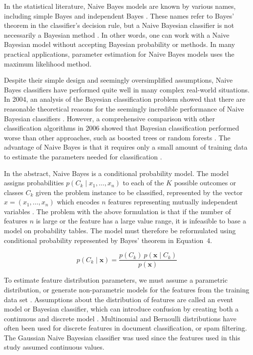 \documentclass[sn-mathphys-num]{sn-jnl}%
\begin{document}
In the statistical literature, Naive Bayes models are known by various names, including simple Bayes and independent Bayes \cite{Hand2001}. These names refer to Bayes' theorem in the classifier's decision rule, but a Naive Bayesian classifier is not necessarily a Bayesian method \cite{Russell1999, Hand2001}. In other words, one can work with a Naive Bayesian model without accepting Bayesian probability or methods. In many practical applications, parameter estimation for Naive Bayes models uses the maximum likelihood method.

Despite their simple design and seemingly oversimplified assumptions, Naive Bayes classifiers have performed quite well in many complex real-world situations. In 2004, an analysis of the Bayesian classification problem showed that there are reasonable theoretical reasons for the seemingly incredible performance of Naive Bayesian classifiers \cite{Zhang2004}. However, a comprehensive comparison with other classification algorithms in 2006 showed that Bayesian classification performed worse than other approaches, such as boosted trees or random forests \cite{Caruana2006}. The advantage of Naive Bayes is that it requires only a small amount of training data to estimate the parameters needed for classification \cite{stackexchange}.

In the abstract, Naive Bayes is a conditional probability model. The model assigns probabilities $p(C_{k}\mid x_{1},\ldots, x_{n})$ to each of the $K$ possible outcomes or classes $C_{k}$ given the problem instance to be classified, represented by the vector $x = (x_{1},\ldots, x_{n})$ which encodes $n$ features representing mutually independent variables \cite{Murty2011}. The problem with the above formulation is that if the number of features $n$ is large or the feature has a large value range, it is infeasible to base a model on probability tables. The model must therefore be reformulated using conditional probability represented by Bayes' theorem in Equation~4.

\begin{equation}
	p(C_{k}\mid \mathbf{x})={\frac{p(C_{k})\ p(\mathbf{x} \mid C_{k})}{p(\mathbf{x})}}
	\label{eqn:4}
\end{equation}

To estimate feature distribution parameters, we must assume a parametric distribution, or generate non-parametric models for the features from the training data set \cite{John2013}. Assumptions about the distribution of features are called an event model or Bayesian classifier, which can introduce confusion by creating both a continuous and discrete model \cite{Mccallum2001, Metsis2006}. Multinomial and Bernoulli distributions have often been used for discrete features in document classification, or spam filtering. The Gaussian Naive Bayesian classifier was used since the features used in this study assumed continuous values.
\end{document}
